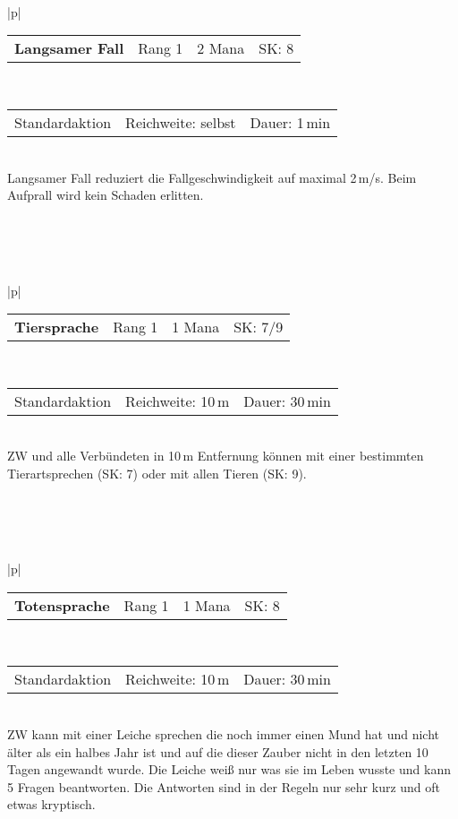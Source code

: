 \documentclass[../../Heldenanleitung2]{subfiles}
\begin{document}
\\\\\\
\begin{tabular}{|p{\textwidth}|}
\hline
\begin{tabularx}{\textwidth}{X|X|X|X}
\textbf{Langsamer Fall} & Rang 1 & 2 Mana & SK: 8
\end{tabularx} \\ \hline
\begin{tabularx}{\textwidth}{X|X|X}
Standardaktion & Reichweite: selbst & Dauer: 1\,min
\end{tabularx} \\ \hline
Langsamer Fall reduziert die Fallgeschwindigkeit auf maximal 2\,m/s. Beim Aufprall wird kein Schaden erlitten.
\\ \hline
\end{tabular}
\\\\\\
\begin{tabular}{|p{\textwidth}|}
\hline
\begin{tabularx}{\textwidth}{X|X|X|X}
\textbf{Tiersprache} & Rang 1 & 1 Mana & SK: 7/9
\end{tabularx} \\ \hline
\begin{tabularx}{\textwidth}{X|X|X}
Standardaktion & Reichweite: 10\,m & Dauer: 30\,min
\end{tabularx} \\ \hline
ZW und alle Verbündeten in 10\,m Entfernung können mit einer bestimmten Tierartsprechen (SK: 7) oder mit allen Tieren (SK: 9).
\\ \hline
\end{tabular}
\\\\\\
\begin{tabular}{|p{\textwidth}|}
\hline
\begin{tabularx}{\textwidth}{X|X|X|X}
\textbf{Totensprache} & Rang 1 & 1 Mana & SK: 8
\end{tabularx} \\ \hline
\begin{tabularx}{\textwidth}{X|X|X}
Standardaktion & Reichweite: 10\,m & Dauer: 30\,min
\end{tabularx} \\ \hline
ZW kann mit einer Leiche sprechen die noch immer einen Mund hat und nicht älter als ein halbes Jahr ist und auf die dieser Zauber nicht in den letzten 10 Tagen angewandt wurde. Die Leiche weiß nur was sie im Leben wusste und kann 5 Fragen beantworten. Die Antworten sind in der Regeln nur sehr kurz und oft etwas kryptisch.
\\ \hline
\end{tabular}
\end{document}
